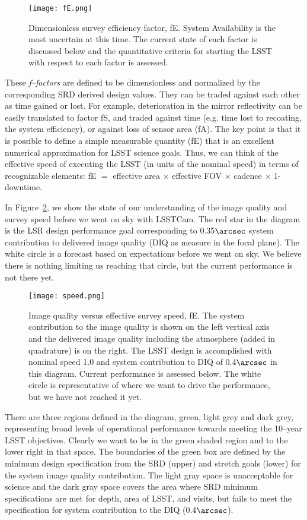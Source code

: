 \begin{figure}%
\centering
\texttt{[image: fE.png]}
\caption{Dimensionless survey efficiency factor, fE. System Availability is the most uncertain at this time. The current state of each factor is discussed below and the quantitative criteria for starting the LSST with respect to each factor is assessed.}
\label{fE}
\end{figure}

These {\it f--factors} are defined to be dimensionless and normalized by the corresponding SRD derived design values. They can be traded against each other as time gained or lost.  For example, deterioration in the mirror reflectivity can be easily translated to factor fS, and traded against time (e.g. time lost to recoating, the system efficiency), or against loss of sensor area (fA).
The key point is that it is possible to define a simple measurable quantity (fE) that is an excellent numerical approximation for LSST science goals. Thus, we can think of the effective speed of executing the LSST (in units of the nominal speed) in terms of recognizable elements:  fE $=$ effective area $\times$ effective FOV $\times$ cadence $\times$ 1-downtime.

In Figure~\ref{speed}, we show the state of our understanding of the image quality and survey speed before we went on sky with LSSTCam. The red star in the diagram is the LSR design performance goal corresponding to 0.35$\arcsec$ system contribution to delivered image quality (DIQ as measure in the focal plane). The white circle is a forecast based on expectations before we went on sky. We believe there is nothing limiting us reaching that circle, but the current performance is not there yet. 

\begin{figure}[t]
\centering
\texttt{[image: speed.png]}
\caption{Image quality versus effective survey speed, fE. The system contribution to the image quality is shown on the left vertical axis and the delivered image quality including the atmosphere (added in quadrature) is on the right. The LSST design is accomplished with nominal speed 1.0 and system contribution to DIQ of 0.4$\arcsec$ in this diagram. Current performance is assessed below. The white circle is representative of where we want to drive the performance, but we have not reached it yet.}
\label{speed}
\end{figure}

There are three regions defined in the diagram, green, light grey and dark grey, representing broad levels of operational performance towards meeting the 10--year LSST objectives. Clearly we want to be in the green shaded region and to the lower right in that space. The boundaries of the green box are defined by the minimum design specification from the SRD (upper) and stretch goals (lower) for the system image quality contribution.  The light gray space is unacceptable for science and the dark gray space covers the area where SRD minimum specifications are met for depth, area of LSST, and visits, but fails to meet the specification for system contribution to the DIQ (0.4$\arcsec$). 

